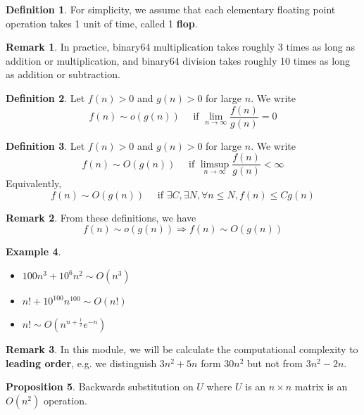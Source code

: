 \documentclass[12pt,a4paper]{article}
\theoremstyle{definition}
\newtheorem{definition}{Definition}[subsection]
\newtheorem{proposition}[definition]{Proposition}
\newtheorem{example}[definition]{Example}
\newtheorem*{remark}{Remark}
\begin{document}
\begin{definition}
	For simplicity, we assume that each elementary floating point operation takes 1 unit of time, called 1 \textbf{flop}.
\end{definition}

\begin{remark}
	In practice, binary64 multiplication takes roughly 3 times as long as addition or multiplication, and binary64 division takes roughly 10 times as long as addition or subtraction.
\end{remark}

\begin{definition}
	Let $f(n) > 0$ and $g(n) > 0$ for large $n$. We write
	\[
		f(n) \sim o(g(n)) \quad \text{ if } \lim_{n \rightarrow \infty} \frac{f(n)}{g(n)} = 0
	\]
\end{definition}

\begin{definition}
	Let $f(n) > 0$ and $g(n) > 0$ for large $n$. We write
	\[
		f(n) \sim O(g(n)) \quad \text{ if } \limsup_{n \rightarrow \infty} \frac{f(n)}{g(n)} < \infty
	\]
	Equivalently,
	\[
		f(n) \sim O(g(n)) \quad \text{ if } \exists C, \exists N, \forall n \le N, f(n) \le C g(n)
	\]
\end{definition}

\begin{remark}
	From these definitions, we have
	\[
		f(n) \sim o(g(n)) \Longrightarrow f(n) \sim O(g(n))
	\]
\end{remark}

\begin{example}
	\hfill
	\begin{itemize}
		\item $100n^3 + 10^6 n^2 \sim O(n^3)$
		\item $n! + 10^{100} n^{100} \sim O(n!)$
		\item $n! \sim O(n^{n + \frac{1}{2}} e^{-n})$
	\end{itemize}
\end{example}

\begin{remark}
	In this module, we will be calculate the computational complexity to \textbf{leading order}, e.g. we distinguish $3n^2 + 5n$ form $30n^2$ but not from $3n^2 - 2n$.
\end{remark}

\begin{proposition}
	Backwards substitution on $U$ where $U$ is an $n \times n$ matrix is an $O(n^2)$ operation.
\end{proposition}
\end{document}
